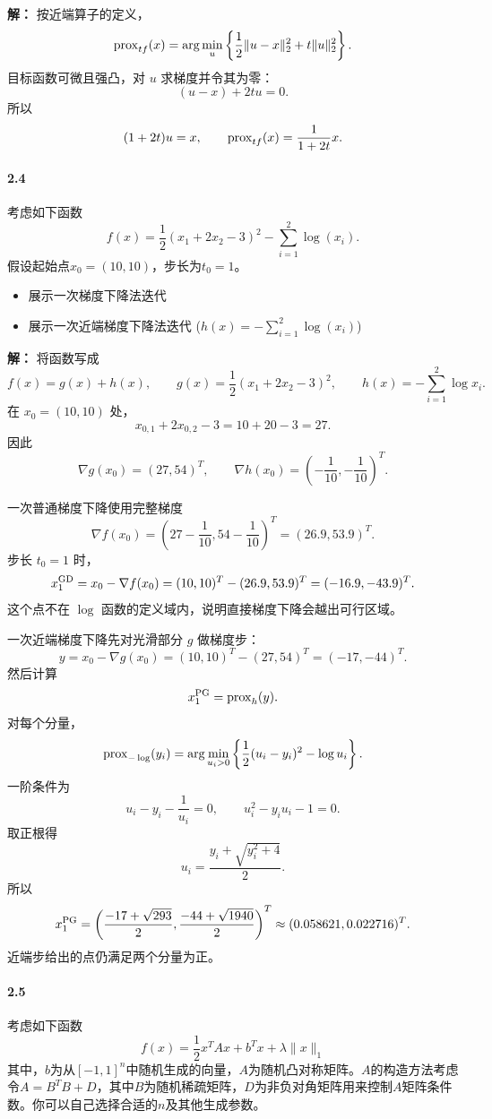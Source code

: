 \documentclass[12pt,a4paper]{article}
\begin{document}
\textbf{解：}
按近端算子的定义，
\[
  {\rm prox}_{tf}(x)
  =
  \arg\min_u
  \left\{
    \frac12\|u-x\|_2^2+t\|u\|_2^2
  \right\}.
\]
目标函数可微且强凸，对 $u$ 求梯度并令其为零：
\[
  (u-x)+2tu=0.
\]
所以
\[
  (1+2t)u=x,
  \qquad
  {\rm prox}_{tf}(x)=\frac{1}{1+2t}x.
\]



\paragraph{2.4}
考虑如下函数 $$f(x)=\frac{1}{2}(x_1+2x_2-3)^2-\sum_{i=1}^2 \log(x_i).$$
假设起始点$x_0=(10,10)$，步长为$t_0=1$。 
\begin{itemize}
	\item 展示一次梯度下降法迭代
	\item 展示一次近端梯度下降法迭代 ($h(x)=-\sum_{i=1}^2 \log(x_i)$)
\end{itemize}

\textbf{解：}
将函数写成
\[
  f(x)=g(x)+h(x),
  \qquad
  g(x)=\frac12(x_1+2x_2-3)^2,
  \qquad
  h(x)=-\sum_{i=1}^2\log x_i.
\]
在 $x_0=(10,10)$ 处，
\[
  x_{0,1}+2x_{0,2}-3=10+20-3=27.
\]
因此
\[
  \nabla g(x_0)=(27,54)^T,
  \qquad
  \nabla h(x_0)=\left(-\frac{1}{10},-\frac{1}{10}\right)^T.
\]

一次普通梯度下降使用完整梯度
\[
  \nabla f(x_0)
  =
  \left(27-\frac{1}{10},54-\frac{1}{10}\right)^T
  =(26.9,53.9)^T.
\]
步长 $t_0=1$ 时，
\[
  x_1^{\rm GD}
  =
  x_0-\nabla f(x_0)
  =
  (10,10)^T-(26.9,53.9)^T
  =
  (-16.9,-43.9)^T.
\]
这个点不在 $\log$ 函数的定义域内，说明直接梯度下降会越出可行区域。

一次近端梯度下降先对光滑部分 $g$ 做梯度步：
\[
  y=x_0-\nabla g(x_0)
  =(10,10)^T-(27,54)^T
  =(-17,-44)^T.
\]
然后计算
\[
  x_1^{\rm PG}
  =
  {\rm prox}_{h}(y).
\]
对每个分量，
\[
  {\rm prox}_{-\log}(y_i)
  =
  \arg\min_{u_i>0}
  \left\{
    \frac12(u_i-y_i)^2-\log u_i
  \right\}.
\]
一阶条件为
\[
  u_i-y_i-\frac1{u_i}=0,
  \qquad
  u_i^2-y_i u_i-1=0.
\]
取正根得
\[
  u_i=\frac{y_i+\sqrt{y_i^2+4}}{2}.
\]
所以
\[
  x_1^{\rm PG}
  =
  \left(
    \frac{-17+\sqrt{293}}{2},
    \frac{-44+\sqrt{1940}}{2}
  \right)^T
  \approx
  (0.058621,0.022716)^T.
\]
近端步给出的点仍满足两个分量为正。

\paragraph{2.5} 考虑如下函数
$$f(x)=\frac{1}{2}x^TAx+b^Tx+\lambda \|x\|_1$$
其中，$b$为从$[-1,1]^n$中随机生成的向量，$A$为随机凸对称矩阵。$A$的构造方法考虑令$A=B^TB+D$，其中$B$为随机稀疏矩阵，$D$为非负对角矩阵用来控制$A$矩阵条件数。你可以自己选择合适的$n$及其他生成参数。
\end{document}
